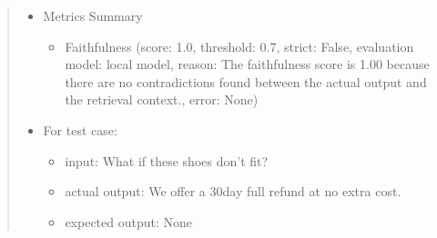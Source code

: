 \documentclass[letterpaper,11pt,english]{sphinxmanual}
\begin{document}
\begin{itemize}
\begin{itemize}
\begin{quote}
\begin{sphinxVerbatim}[commandchars=\\\{\}]
  \PYG{p}{[}\PYG{p}{]}

  
  


\PYG{p}{[}\PYG{p}{]} \PYG{p}{[}\PYG{p}{]}
\end{sphinxVerbatim}
\begin{itemize}
\item {} 
\sphinxAtStartPar
Metrics Summary
\begin{itemize}
\item {} 
\sphinxAtStartPar
Faithfulness (score: 1.0, threshold: 0.7, strict: False, evaluation model:
local model, reason: The faithfulness score is 1.00 because there are no
contradictions found between the actual output and the retrieval context., error: None)

\end{itemize}

\item {} 
\sphinxAtStartPar
For test case:
\begin{itemize}
\item {} 
\sphinxAtStartPar
input: What if these shoes don’t fit?

\item {} 
\sphinxAtStartPar
actual output: We offer a 30\sphinxhyphen{}day full refund at no extra cost.

\item {} 
\sphinxAtStartPar
expected output: None


\end{itemize}
\end{itemize}
\end{quote}
\end{itemize}
\end{itemize}
\end{document}
